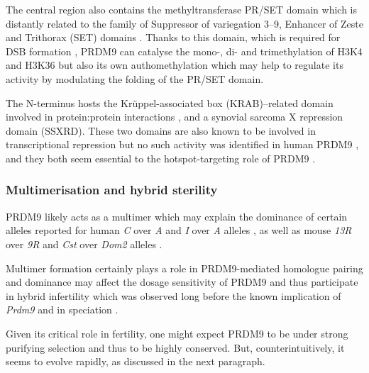 The central region also contains the methyltransferase PR/SET domain which is distantly related to the family of Suppressor of variegation 3–9, Enhancer of Zeste and Trithorax (SET) domains \citep[reviewed in][]{grey2018prdm9}.
Thanks to this domain, which is required for DSB formation \citep{diagouraga2018prdm9}, PRDM9 can catalyse the mono-, di- and trimethylation of H3K4 and H3K36 \citep{wu2013molecular,powers2016meiotic} but also its own authomethylation \citep{koh-stenta2017discovery} which may help to regulate its activity by modulating the folding of the PR/SET domain.

The N-terminus hosts the Kr\"uppel-associated box (KRAB)–related domain involved in protein:protein interactions \citep{parvanov2016prdm9,parvanov2017prdm9,imai2017prdm9}, and a synovial sarcoma X repression domain (SSXRD).
These two domains are also known to be involved in transcriptional repression \citep{margolin1994kruppelassociated,lim1998krabrelated} but no such activity was identified in human PRDM9 \citep{born2014bsubdomain}, and they both seem essential to the hotspot-targeting role of PRDM9 \citep{baker2017repeated,thibault-sennett2018interrogating}.


\subsubsection{Multimerisation and hybrid sterility}

PRDM9 likely acts as a multimer \citep{baker2015multimer,altemose2017map,schwarz2018prdm9} which may explain the dominance of certain alleles reported for human \textit{C} over \textit{A} \citep{pratto2014recombination} and \textit{I} over \textit{A} alleles \citep{baudat2010prdm9}, as well as mouse \textit{13R} over \textit{9R} \citep{brick2012genetic} and \textit{Cst} over \textit{Dom2} alleles \citep{smagulova2011genomewide, baker2015prdm9, baker2015multimer}.

Multimer formation certainly plays a role in PRDM9-mediated homologue pairing \citep{davies2016reengineering} and dominance may affect the dosage sensitivity of PRDM9 \citep{flachs2012interallelic, segurel2011case} and thus participate in hybrid infertility which was observed long before the known implication of \textit{Prdm9} \citep{forejt1974genetic} and in speciation \citep{mihola2009mouse}.

Given its critical role in fertility, one might expect PRDM9 to be under strong purifying selection and thus to be highly conserved. 
But, counterintuitively, it seems to evolve rapidly, as discussed in the next paragraph.



